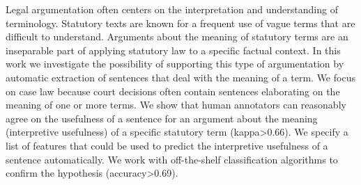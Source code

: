 Legal argumentation often centers on the interpretation and understanding of terminology. Statutory texts are known for a frequent use of vague terms that are difficult to understand. Arguments about the meaning of statutory terms are an inseparable part of applying statutory law to a specific factual context. In this work we investigate the possibility of supporting this type of argumentation by automatic extraction of sentences that deal with the meaning of a term. We focus on case law because court decisions often contain sentences elaborating on the meaning of one or more terms. We show that human annotators can reasonably agree on the usefulness of a sentence for an argument about the meaning (interpretive usefulness) of a specific statutory term (kappa>0.66). We specify a list of features that could be used to predict the interpretive usefulness of a sentence automatically. We work with off-the-shelf classification algorithms to confirm the hypothesis (accuracy>0.69).
